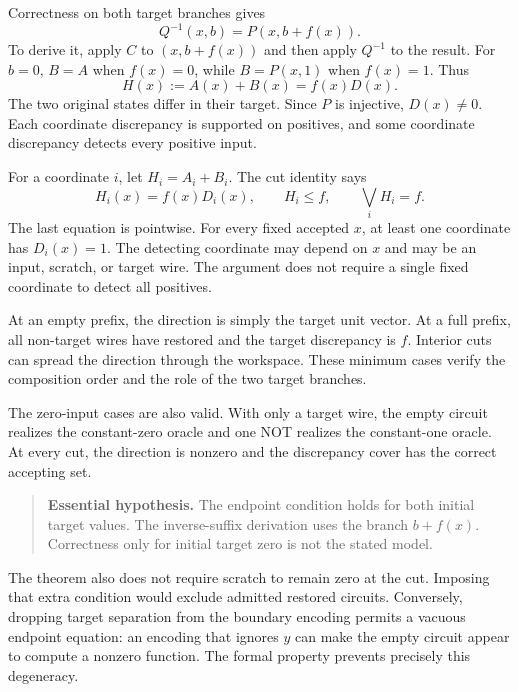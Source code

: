 
Correctness on both target branches gives
\[
 Q^{-1}(x,b)=P(x,b+f(x)).
\]
To derive it, apply $C$ to $(x,b+f(x))$ and then apply $Q^{-1}$ to the result.
For $b=0$, $B=A$ when $f(x)=0$, while $B=P(x,1)$ when $f(x)=1$. Thus
\[
 H(x):=A(x)+B(x)=f(x)D(x).
\]
The two original states differ in their target. Since $P$ is injective,
$D(x)\ne0$. Each coordinate discrepancy is supported on positives, and
some coordinate discrepancy detects every positive input.


For a coordinate $i$, let $H_i=A_i+B_i$. The cut identity says
\[
 H_i(x)=f(x)D_i(x),\qquad H_i\le f,\qquad \bigvee_i H_i=f.
\]
The last equation is pointwise. For every fixed accepted $x$, at least one
coordinate has $D_i(x)=1$. The detecting coordinate may depend on $x$ and
may be an input, scratch, or target wire. The argument does not require a
single fixed coordinate to detect all positives.

At an empty prefix, the direction is simply the target unit vector. At a
full prefix, all non-target wires have restored and the target discrepancy
is $f$. Interior cuts can spread the direction through the workspace.
These minimum cases verify the composition order and the role of the two
target branches.

The zero-input cases are also valid. With only a target wire, the empty
circuit realizes the constant-zero oracle and one NOT realizes the
constant-one oracle. At every cut, the direction is nonzero and the
discrepancy cover has the correct accepting set.

\begin{quote}\small
\textbf{Essential hypothesis.} The endpoint condition holds for both initial
target values. The inverse-suffix derivation uses the branch $b+f(x)$.
Correctness only for initial target zero is not the stated model.
\end{quote}

The theorem also does not require scratch to remain zero at the cut. Imposing
that extra condition would exclude admitted restored circuits. Conversely,
dropping target separation from the boundary encoding permits a vacuous
endpoint equation: an encoding that ignores $y$ can make the empty circuit
appear to compute a nonzero function. The formal 
property prevents precisely this degeneracy.

